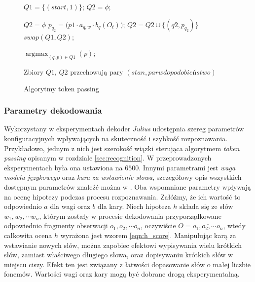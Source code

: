 \documentclass[shortabstract, mgr]{iithesis}
\DeclareMathOperator*{\argmax}{\arg\max}   %
\begin{document}
		    \begin{figure}
		    	\begin{algorithmic}[1]
		    		
		    		
		    		\STATE $Q1 = \{(start, 1)\}$; 
		    		\STATE $Q2 = \phi$;		    
		    		
			    		\STATE $Q2 = \phi$
					    		\STATE $p_{q_2} = \bigg( p1\cdot a_{q,w}\cdot b_q(O_t) \label{line:b_q} \bigg)$;				    	
					    		\STATE $Q2 = Q2 \cup \{(q2, p_{q_2})\}$
				    		\ENDFOR
			    		\ENDFOR
			    		\STATE $swap(Q1, Q2)$;
		    		\ENDFOR
		    		
		    		\RETURN $\argmax_{(q,p)\in Q1}(p)$;
		    	\end{algorithmic}
	    	
		    	Zbiory $Q1$, $Q2$ przechowują pary $(stan, parwdopodobieństwo)$ 
		    	
		    	\caption{Algorytmy token passing}
		    	\label{alg:token_passing}
		    \end{figure}				   	
       

\subsubsection{Parametry dekodowania}
	\label{sec:meta_params}
	 	Wykorzystany w eksperymentach dekoder \textit{Julius} udostępnia szereg parametrów konfiguracyjnych wpływających na skuteczność i szybkość rozpoznawania. Przykładowo, jednym z nich jest szerokość wiązki sterująca algorytmem \textit{token passing} opisanym w rozdziale \ref{sec:recognition}. W przeprowadzonych eksperymentach była ona ustawiona na $6500$. Innymi parametrami jest \textit{waga modelu językowego} oraz \textit{kara za wstawienie słowa}, szczegółowy opis wszystkich dostępnym parametrów znaleźć można w \cite{juliusbook}. Oba wspomniane parametry wpływają na ocenę hipotezy podczas procesu rozpoznawania. Załóżmy, że ich wartość to odpowiednio $a$ dla wagi oraz $b$ dla kary. Niech hipoteza $h$ składa się ze słów $w_1, w_2, \cdots w_n$, którym zostały w procesie dekodowania przyporządkowane odpowiednio fragmenty obserwacji $o_1, o_2, \cdots o_n$, oczywiście $O=\overline{o_1,o_2,\cdots o_n}$, wtedy całkowita ocena $h$ wyrażona jest wzorem \ref{eqn:h_score}. Manipulując karą za wstawianie nowych słów, można zapobiec efektowi wypisywania wielu krótkich słów, zamiast właściwego długiego słowa, oraz dopisywaniu krótkich słów w miejscu ciszy. Efekt ten jest związany z łatwości dopasowanie słów o małej liczbie fonemów.  Wartości wagi oraz kary mogą być dobrane drogą eksperymentalną.
	
\end{document}
